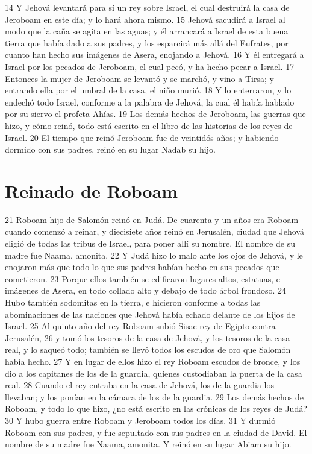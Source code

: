 14 Y Jehová levantará para sí un rey sobre Israel, el cual destruirá la casa de Jeroboam en este día; y lo hará ahora mismo.
15 Jehová sacudirá a Israel al modo que la caña se agita en las aguas; y él arrancará a Israel de esta buena tierra que había dado a sus padres, y los esparcirá más allá del Eufrates, por cuanto han hecho sus imágenes de Asera, enojando a Jehová.
16 Y él entregará a Israel por los pecados de Jeroboam, el cual pecó, y ha hecho pecar a Israel.
17 Entonces la mujer de Jeroboam se levantó y se marchó, y vino a Tirsa; y entrando ella por el umbral de la casa, el niño murió.
18 Y lo enterraron, y lo endechó todo Israel, conforme a la palabra de Jehová, la cual él había hablado por su siervo el profeta Ahías.
19 Los demás hechos de Jeroboam, las guerras que hizo, y cómo reinó, todo está escrito en el libro de las historias de los reyes de Israel.
20 El tiempo que reinó Jeroboam fue de veintidós años; y habiendo dormido con sus padres, reinó en su lugar Nadab su hijo.

\section*{Reinado de Roboam}

21 Roboam hijo de Salomón reinó en Judá. De cuarenta y un años era Roboam cuando comenzó a reinar, y diecisiete años reinó en Jerusalén, ciudad que Jehová eligió de todas las tribus de Israel, para poner allí su nombre. El nombre de su madre fue Naama, amonita.
22 Y Judá hizo lo malo ante los ojos de Jehová, y le enojaron más que todo lo que sus padres habían hecho en sus pecados que cometieron.
23 Porque ellos también se edificaron lugares altos, estatuas, e imágenes de Asera, en todo collado alto y debajo de todo árbol frondoso. 
24 Hubo también sodomitas en la tierra, e hicieron conforme a todas las abominaciones de las naciones que Jehová había echado delante de los hijos de Israel.
25 Al quinto año del rey Roboam subió Sisac rey de Egipto contra Jerusalén, 
26 y tomó los tesoros de la casa de Jehová, y los tesoros de la casa real, y lo saqueó todo; también se llevó todos los escudos de oro que Salomón había hecho. 
27 Y en lugar de ellos hizo el rey Roboam escudos de bronce, y los dio a los capitanes de los de la guardia, quienes custodiaban la puerta de la casa real.
28 Cuando el rey entraba en la casa de Jehová, los de la guardia los llevaban; y los ponían en la cámara de los de la guardia.
29 Los demás hechos de Roboam, y todo lo que hizo, ¿no está escrito en las crónicas de los reyes de Judá?
30 Y hubo guerra entre Roboam y Jeroboam todos los días.
31 Y durmió Roboam con sus padres, y fue sepultado con sus padres en la ciudad de David. El nombre de su madre fue Naama, amonita. Y reinó en su lugar Abiam su hijo.

